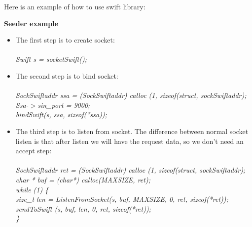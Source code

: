 

Here is an example of how to use swift library:

\textbf{Seeder example}
\begin{itemize}
 \item The first step is to create socket:\\\\
\small{\emph{
\hspace*{1cm}	Swift s = socketSwift();
}}
 \item The second step is to bind socket: \\\\
\small{\emph{
\hspace*{1cm}	SockSwiftaddr ssa = (SockSwiftaddr) calloc (1, sizeof(struct, sockSwiftaddr);\\
\hspace*{1cm}	Ssa-$>$sin_port = 9000;\\
\hspace*{1cm}	bindSwift(s, ssa, sizeof(*ssa));\\
}}
 \item The third step is to listen from socket. The difference between normal socket listen is that after listen we will
have the request data, so we don’t need an accept step:\\\\
\small{\emph{
\hspace*{1cm}	SockSwiftaddr ret =  (SockSwiftaddr) calloc (1, sizeof(struct, sockSwiftaddr);\\
\hspace*{1cm}	char * buf = (char*) calloc(MAXSIZE, ret);\\
\hspace*{1cm}	while (1) \{\\
\hspace*{1.7cm}	size_t len = ListenFromSocket(s, buf, MAXSIZE, 0, ret, sizeof(*ret));\\
\hspace*{1.7cm}	sendToSwift (s, buf, len, 0, ret, sizeof(*ret));\\
\hspace*{1cm}	\}
}}
\end{itemize}

